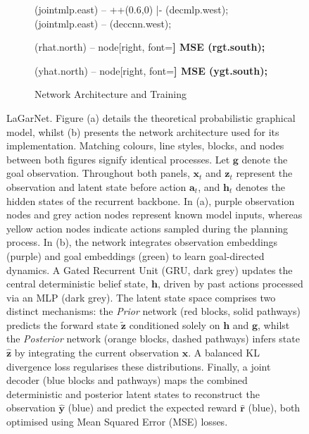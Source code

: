\documentclass[journal]{IEEEtran}
\newcommand{\addinfo}[1]{\textcolor{myPurple}{#1}}
\begin{document}
\begin{figure}[t!]
\begin{subfigure}[t]{0.98\linewidth}
{    %
     (jointmlp.east) -- ++(0.6,0) |- (decmlp.west);
     (jointmlp.east) -- (deccnn.west);

     (rhat.north) -- node[right, font=\bfseries] {MSE} (rgt.south);

     (yhat.north) -- node[right, font=\bfseries] {MSE} (ygt.south);
}
        \caption{\addinfo{Network Architecture and Training}}
        \label{fig:network}
    \end{subfigure}
    \caption{\addinfo{LaGarNet. Figure (a) details the theoretical probabilistic graphical model, whilst (b) presents the network architecture used for its implementation. Matching colours, line styles, blocks, and nodes between both figures signify identical processes. Let $\bm{g}$ denote the goal observation. Throughout both panels, $\bm{x}_t$ and $\bm{z}_t$ represent the observation and latent state before action $\bm{a}_t$, and $\bm{h}_t$ denotes the hidden states of the recurrent backbone. In (a), purple observation nodes and grey action nodes represent known model inputs, whereas yellow action nodes indicate actions sampled during the planning process. In (b), the network integrates observation embeddings (purple) and goal embeddings (green) to learn goal-directed dynamics. A Gated Recurrent Unit (GRU, dark grey) updates the central deterministic belief state, $\boldsymbol{h}$, driven by past actions processed via an MLP (dark grey). The latent state space comprises two distinct mechanisms: the \textit{Prior} network (red blocks, solid pathways) predicts the forward state $\boldsymbol{\tilde{z}}$ conditioned solely on $\boldsymbol{h}$ and $\boldsymbol{g}$, whilst the \textit{Posterior} network (orange blocks, dashed pathways) infers state $\boldsymbol{\hat{z}}$ by integrating the current observation $\boldsymbol{x}$. A balanced KL divergence loss regularises these distributions. Finally, a joint decoder (blue blocks and pathways) maps the combined deterministic and posterior latent states to reconstruct the observation $\boldsymbol{\hat{y}}$ (blue) and predict the expected reward $\boldsymbol{\hat{r}}$ (blue), both optimised using Mean Squared Error (MSE) losses.}}
    \label{fig:lagarnet}
\end{figure}
\end{document}
